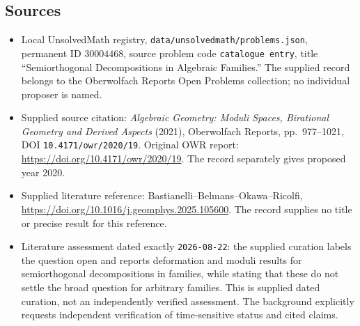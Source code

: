\documentclass[11pt]{article}
\begin{document}
\subsection{Sources}
\begin{itemize}
\item Local UnsolvedMath registry, \texttt{data/unsolvedmath/problems.json}, permanent ID \(30004468\), source problem code \texttt{catalogue entry}, title ``Semiorthogonal Decompositions in Algebraic Families.'' The supplied record belongs to the Oberwolfach Reports Open Problems collection; no individual proposer is named.
\item Supplied source citation: \emph{Algebraic Geometry: Moduli Spaces, Birational Geometry and Derived Aspects} (2021), Oberwolfach Reports, pp.\ 977--1021, DOI \texttt{10.4171/owr/2020/19}. Original OWR report: \url{https://doi.org/10.4171/owr/2020/19}. The record separately gives proposed year 2020.
\item Supplied literature reference: Bastianelli--Belmans--Okawa--Ricolfi, \url{https://doi.org/10.1016/j.geomphys.2025.105600}. The record supplies no title or precise result for this reference.
\item Literature assessment dated exactly \texttt{2026-08-22}: the supplied curation labels the question open and reports deformation and moduli results for semiorthogonal decompositions in families, while stating that these do not settle the broad question for arbitrary families. This is supplied dated curation, not an independently verified assessment. The background explicitly requests independent verification of time-sensitive status and cited claims.
\end{itemize}
\end{document}

